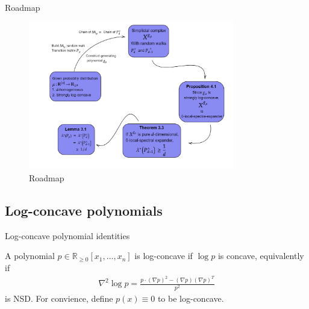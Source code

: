 \documentclass[10pt]{beamer}
\newcommand{\R}{\mathbb{R}}
\begin{document}
\begin{frame}{Roadmap}
    \begin{figure}[H]
        \centering
        \includegraphics[width  = 0.8\textwidth]{imgs/diagram-20231214 (1).png}
        \caption{Roadmap}
        \label{fig:enter-label}
    \end{figure}
\end{frame}

\subsection{Log-concave polynomials}
\begin{frame}{Log-concave polynomial identities}
    \begin{definition}
    A polynomial $p \in \R_{\geq 0}[x_1, \ldots, x_n]$ is log-concave if $\log p$ is concave, equivalently if \begin{align*}
        \nabla^2 \log p = \frac{p \cdot (\nabla p)^2 - (\nabla p)(\nabla p)^T}{p^2}
    \end{align*}
    is NSD. For convience, define $p(x) \equiv 0$ to be log-concave.
    \end{definition}
\end{frame}
\end{document}
